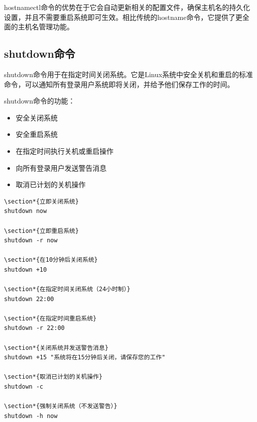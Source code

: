 \documentclass[12pt,UTF8]{ctexbook}
\begin{document}
hostnamectl命令的优势在于它会自动更新相关的配置文件，确保主机名的持久化设置，并且不需要重启系统即可生效。相比传统的hostname命令，它提供了更全面的主机名管理功能。

\subsection{shutdown命令}
shutdown命令用于在指定时间关闭系统。它是Linux系统中安全关机和重启的标准命令，可以通知所有登录用户系统即将关闭，并给予他们保存工作的时间。

shutdown命令的功能：
\begin{itemize}
    \item 安全关闭系统
    \item 安全重启系统
    \item 在指定时间执行关机或重启操作
    \item 向所有登录用户发送警告消息
    \item 取消已计划的关机操作
\end{itemize}

\begin{verbatim}
\section*{立即关闭系统}
shutdown now

\section*{立即重启系统}
shutdown -r now

\section*{在10分钟后关闭系统}
shutdown +10

\section*{在指定时间关闭系统（24小时制）}
shutdown 22:00

\section*{在指定时间重启系统}
shutdown -r 22:00

\section*{关闭系统并发送警告消息}
shutdown +15 "系统将在15分钟后关闭，请保存您的工作"

\section*{取消已计划的关机操作}
shutdown -c

\section*{强制关闭系统（不发送警告）}
shutdown -h now
\end{verbatim}
\end{document}
